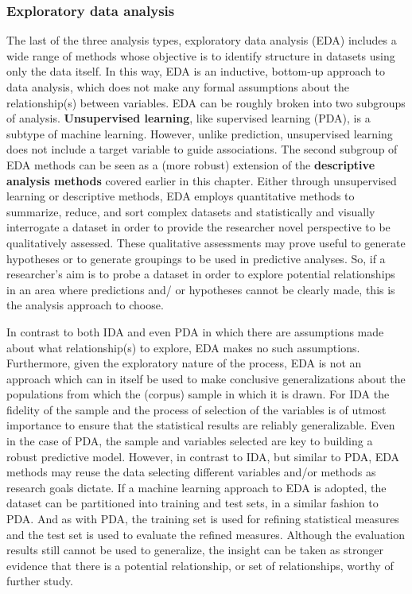 \documentclass[
]{article}
\begin{document}
\hypertarget{exploratory-data-analysis}{%
\subsubsection{Exploratory data analysis}\label{exploratory-data-analysis}}

The last of the three analysis types, exploratory data analysis (EDA) includes a wide range of methods whose objective is to identify structure in datasets using only the data itself. In this way, EDA is an inductive, bottom-up approach to data analysis, which does not make any formal assumptions about the relationship(s) between variables. EDA can be roughly broken into two subgroups of analysis. \textbf{Unsupervised learning}, like supervised learning (PDA), is a subtype of machine learning. However, unlike prediction, unsupervised learning does not include a target variable to guide associations. The second subgroup of EDA methods can be seen as a (more robust) extension of the \textbf{descriptive analysis methods} covered earlier in this chapter. Either through unsupervised learning or descriptive methods, EDA employs quantitative methods to summarize, reduce, and sort complex datasets and statistically and visually interrogate a dataset in order to provide the researcher novel perspective to be qualitatively assessed. These qualitative assessments may prove useful to generate hypotheses or to generate groupings to be used in predictive analyses. So, if a researcher's aim is to probe a dataset in order to explore potential relationships in an area where predictions and/ or hypotheses cannot be clearly made, this is the analysis approach to choose.

In contrast to both IDA and even PDA in which there are assumptions made about what relationship(s) to explore, EDA makes no such assumptions. Furthermore, given the exploratory nature of the process, EDA is not an approach which can in itself be used to make conclusive generalizations about the populations from which the (corpus) sample in which it is drawn. For IDA the fidelity of the sample and the process of selection of the variables is of utmost importance to ensure that the statistical results are reliably generalizable. Even in the case of PDA, the sample and variables selected are key to building a robust predictive model. However, in contrast to IDA, but similar to PDA, EDA methods may reuse the data selecting different variables and/or methods as research goals dictate. If a machine learning approach to EDA is adopted, the dataset can be partitioned into training and test sets, in a similar fashion to PDA. And as with PDA, the training set is used for refining statistical measures and the test set is used to evaluate the refined measures. Although the evaluation results still cannot be used to generalize, the insight can be taken as stronger evidence that there is a potential relationship, or set of relationships, worthy of further study.
\end{document}
